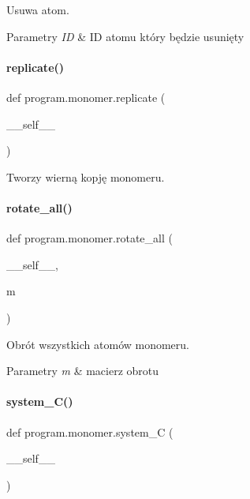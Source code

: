 Usuwa atom. 


\begin{DoxyParams}{Parametry}
{\em ID} & ID atomu który będzie usunięty \\
\hline
\end{DoxyParams}
\mbox{\label{classprogram_1_1monomer_a7b20019215ea0e231ecbf09003c5924d}} 
\paragraph{replicate()}
{\footnotesize\ttfamily def program.\+monomer.\+replicate (\begin{DoxyParamCaption}\item[{}]{\+\_\+\+\_\+self\+\_\+\+\_\+ }\end{DoxyParamCaption})}



Tworzy wierną kopję monomeru. 

\mbox{\label{classprogram_1_1monomer_ab2aa195faf2f4df60084d3d4b766641e}} 
\paragraph{rotate\+\_\+all()}
{\footnotesize\ttfamily def program.\+monomer.\+rotate\+\_\+all (\begin{DoxyParamCaption}\item[{}]{\+\_\+\+\_\+self\+\_\+\+\_\+,  }\item[{}]{m }\end{DoxyParamCaption})}



Obrót wszystkich atomów monomeru. 


\begin{DoxyParams}{Parametry}
{\em m} & macierz obrotu \\
\hline
\end{DoxyParams}
\mbox{\label{classprogram_1_1monomer_a7d031a870249054f59c6a85b270b97a4}} 
\paragraph{system\+\_\+\+C()}
{\footnotesize\ttfamily def program.\+monomer.\+system\+\_\+C (\begin{DoxyParamCaption}\item[{}]{\+\_\+\+\_\+self\+\_\+\+\_\+ }\end{DoxyParamCaption})}



